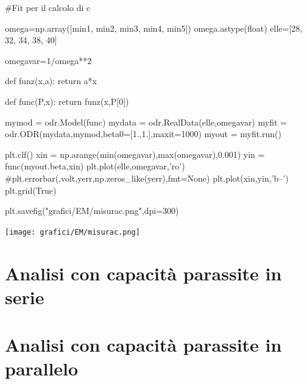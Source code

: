 \begin{sagesilent}

#Fit per il calcolo di c

omega=np.array([min1, min2, min3, min4, min5])
omega.astype(float)
elle=[28, 32, 34, 38, 40]

omegavar=1/omega**2 

def funz(x,a):
    return a*x

def func(P,x):
    return funz(x,P[0])

mymod = odr.Model(func)
mydata = odr.RealData(elle,omegavar)
myfit = odr.ODR(mydata,mymod,beta0=[1.,1.],maxit=1000)
myout = myfit.run()

plt.clf()
xin = np.arange(min(omegavar),max(omegavar),0.001)
yin = func(myout.beta,xin)
plt.plot(elle,omegavar,'ro')
#plt.errorbar(,volt,yerr,np.zeros_like(yerr),fmt=None)
plt.plot(xin,yin,'b--')
plt.grid(True)

plt.savefig("grafici/EM/misurac.png",dpi=300)


\end{sagesilent}

\texttt{[image: grafici/EM/misurac.png]}

\chapter{Analisi con capacità parassite in serie}
\chapter{Analisi con capacità parassite in parallelo}


